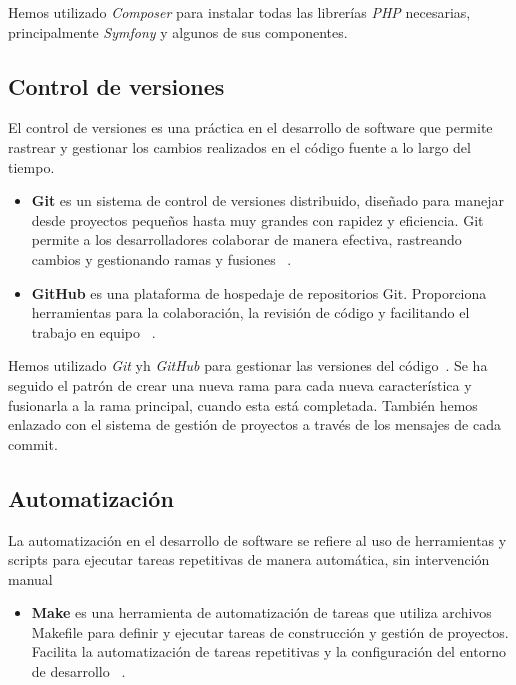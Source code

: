 Hemos utilizado  \textit{Composer} para instalar todas las librerías  \textit{PHP} necesarias, principalmente
\textit{Symfony} y algunos de sus componentes.

\subsection{Control de versiones}

El control de versiones es una práctica en el desarrollo de software que permite rastrear y gestionar los cambios
realizados en el código fuente a lo largo del tiempo.

\begin{itemize}
    \item \textbf{Git}
    es un sistema de control de versiones distribuido, diseñado para manejar desde proyectos pequeños hasta muy grandes
    con rapidez y eficiencia.
    Git permite a los desarrolladores colaborar de manera efectiva, rastreando cambios y gestionando ramas y fusiones
    ~\cite{url_git}.
    \item \textbf{GitHub} es una plataforma de hospedaje de repositorios Git.
    Proporciona herramientas para la colaboración, la revisión de código y facilitando el trabajo en equipo
    ~\cite{url_github}.
\end{itemize}

Hemos utilizado \textit{Git} yh \textit{GitHub} para gestionar las versiones del código~\cite{url_viu_84_proyecto}.
Se ha seguido el patrón de crear una nueva rama para cada nueva característica y fusionarla a la rama principal, cuando
esta está completada.
También hemos enlazado con el sistema de gestión de proyectos a través de los mensajes de cada commit.

\subsection{Automatización}

La automatización en el desarrollo de software se refiere al uso de herramientas y scripts para ejecutar tareas
repetitivas de manera automática, sin intervención manual

\begin{itemize}
    \item \textbf{Make}
    es una herramienta de automatización de tareas que utiliza archivos Makefile para definir y ejecutar tareas de
    construcción y gestión de proyectos.
    Facilita la automatización de tareas repetitivas y la configuración del entorno de desarrollo
    ~\cite{url_make}.
\end{itemize}

